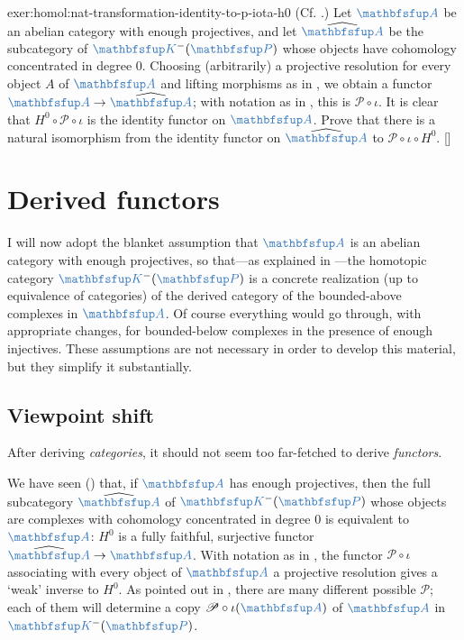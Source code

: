 \begin{exer}{\exerused{}}{exer:homol:nat-transformation-identity-to-p-iota-h0}
  (Cf. .) Let
  $\categ{A}$ be an abelian category with enough projectives, and let
  $\widehat{\categ{A}}$ be the subcategory of $\categ{K}^-(\categ{P})$
  whose objects have cohomology concentrated in degree $0$. Choosing
  (arbitrarily) a projective resolution for every object $A$ of
  $\categ{A}$ and lifting morphisms as in , we
  obtain a functor $\categ{A} \to \widehat{\categ{A}}$; with notation
  as in , this is
  $\mathscr{P} \circ \iota$. It is clear that
  $H^0 \circ \mathscr{P} \circ \iota$ is the identity functor on
  $\categ{A}$.  Prove that there is a natural isomorphism from the
  identity functor on $\widehat{\categ{A}}$ to
  $\mathscr{P} \circ \iota \circ
  H^0$. []
\end{exer}

\section{Derived functors}
\label{sec:homol:derived-functors}

I will now adopt the blanket assumption that $\categ{A}$ is an abelian
category with enough projectives, so that---as explained in
---the homotopic
category $\categ{K}^-(\categ{P})$ is a concrete realization (up to
equivalence of categories) of the derived category of the
bounded-above complexes in $\categ{A}$. Of course everything would go
through, with appropriate changes, for bounded-below complexes in the
presence of enough injectives. These assumptions are not necessary in
order to develop this material, but they simplify it substantially.

\subsection{Viewpoint shift}
\label{subsec:homol:viewpoint-shift}

After deriving \emph{categories}, it should not seem too far-fetched
to derive \emph{functors}.

We have seen
()
that, if $\categ{A}$ has enough
projectives, then the full subcategory $\widehat{\categ{A}}$ of
$\categ{K}^-(\categ{P})$ whose objects are complexes with cohomology
concentrated in degree $0$ is equivalent to $\categ{A}$: $H^0$ is a
fully faithful, surjective functor
$\widehat{\categ{A}} \to \categ{A}$. With notation as in
, the functor
$\mathscr{P} \circ \iota$ associating with every object of $\categ{A}$
a projective resolution gives a `weak' inverse to $H^0$. As pointed
out in , there are
many different possible $\mathscr{P}$; each of them will determine a
copy $\mathscr{P} \circ \iota(\categ{A})$ of $\categ{A}$ in
$\categ{K}^-(\categ{P})$.

